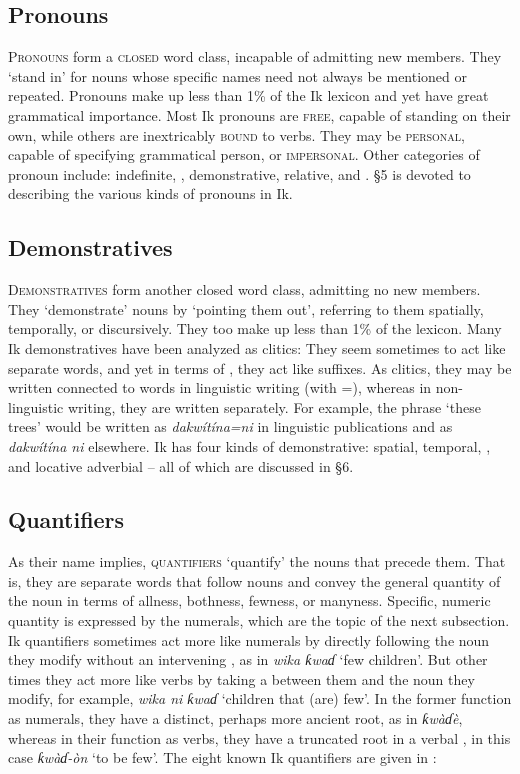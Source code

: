\subsection{Pronouns}\label{sec:3.3}


\textsc{Pronouns} form a \textsc{closed} word class, incapable of admitting new members. They ‘stand in’ for nouns whose specific names need not always be mentioned or repeated. Pronouns make up less than 1\% of the Ik lexicon and yet have great grammatical importance. Most Ik pronouns are \textsc{free}, capable of standing on their own, while others are inextricably \textsc{bound} to verbs. They may be \textsc{personal}, capable of specifying grammatical person, or \textsc{impersonal}. Other categories of pronoun include: indefinite, , demonstrative, relative, and . §5 is devoted to describing the various kinds of pronouns in Ik.
 
\subsection{Demonstratives}\label{sec:3.4}


\textsc{Demonstratives} form another closed word class, admitting no new members. They ‘demonstrate’ nouns by ‘pointing them out’, referring to them spatially, temporally, or discursively. They too make up less than 1\% of the lexicon. Many Ik demonstratives have been analyzed as clitics: They seem sometimes to act like separate words, and yet in terms of , they act like suffixes. As clitics, they may be written connected to words in linguistic writing (with =), whereas in non-linguistic writing, they are written separately. For example, the phrase ‘these trees’ would be written as \textit{dakwítína=ni} in linguistic publications and as \textit{dakwítína ni} elsewhere. Ik has four kinds of demonstrative: spatial, temporal, , and locative adverbial – all of which are discussed in §6.
 
\subsection{Quantifiers}\label{sec:3.5}


As their name implies, \textsc{quantifiers} ‘quantify’ the nouns that precede them. That is, they are separate words that follow nouns and convey the general quantity of the noun in terms of allness, bothness, fewness, or manyness. Specific, numeric quantity is expressed by the numerals, which are the topic of the next subsection. Ik quantifiers sometimes act more like numerals by directly following the noun they modify without an intervening , as in \textit{wika ƙwaɗ{\ᵉ}} ‘few children’. But other times they act more like  verbs by taking a  between them and the noun they modify, for example, \textit{wika ni ƙwaɗ{\ᵉ}} ‘children that (are) few’. In the former function as numerals, they have a distinct, perhaps more ancient root, as in \textit{ƙwàɗè}, whereas in their function as  verbs, they have a truncated root in a verbal , in this case \textit{ƙwàɗ-òn} ‘to be few’. The eight known Ik quantifiers are given in :


